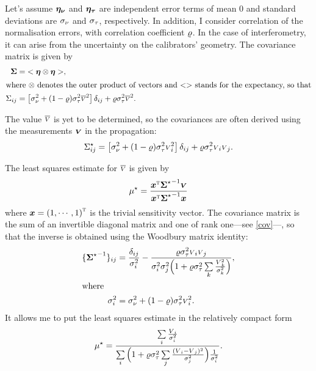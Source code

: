 \documentclass{pasa}
\begin{document}
Let's assume $\boldsymbol{\eta_\nu}$ and $\boldsymbol{\eta_\tau}$ are independent error terms of mean 0 and standard deviations are $\sigma_\nu$ and $\sigma_\tau$, respectively. In addition, I consider correlation of the normalisation errors, with correlation coefficient $\varrho$.  In the case of interferometry, it can arise from the uncertainty on the calibrators' geometry.  The covariance matrix is given by
\begin{align}
    \boldsymbol{\Sigma}     &=  {<\boldsymbol{\eta}\otimes\boldsymbol{\eta}>} ,\\
\intertext{where $\otimes$ denotes the outer product of vectors and $ {<>} $ stands for the expectancy, so that}
    \Sigma_{ij} &= \left[ \sigma_\nu^2 
                  + (1-\varrho)\sigma_\tau^2\overline{{\scriptstyle V}}^2
                \right] \delta_{ij} 
            + \varrho\sigma_\tau^2\overline{{\scriptstyle V}}^2.
\end{align}

The value $\overline{{\scriptstyle V}}$ is yet to be determined, so the covariances are often derived using the measurements $\boldsymbol{{\scriptstyle V}}$ in the propagation:
\begin{equation}
    \Sigma_{ij}^\star = \left[ 
                    \sigma_\nu^2 
                  + (1-\varrho)\sigma_\tau^2 {\scriptstyle V}_i^2
                \right] \delta_{ij} 
            + \varrho\sigma_\tau^2{\scriptstyle V}_i{\scriptstyle V}_j. \label{eq:cov}
\end{equation}

The least squares estimate for $\overline{{\scriptstyle V}}$ is given by
\begin{equation}
    \mu^\star =
                  \frac { {\boldsymbol{x}}^\text{\textsc{t}}{\ensuremath{\boldsymbol{\Sigma}}^\star}^{-1}\boldsymbol{{\scriptstyle V}} }
                        { {\boldsymbol{x}}^\text{\textsc{t}}{\ensuremath{\boldsymbol{\Sigma}}^\star}^{-1}\boldsymbol{x} }
\end{equation}
where $\boldsymbol{x} = {(1, \cdots, 1)}^\text{\textsc{t}}$ is the trivial sensitivity vector.  The covariance matrix is the sum of an invertible diagonal matrix and one of rank one---see \eqref{cov}---, so that the inverse is obtained using the Woodbury matrix identity: 
\begin{align}
    \{ {\boldsymbol{\Sigma}^\star}^{-1} \}_{ij} &= \frac{\delta_{ij}}{\sigma_i^2}
         - \frac{\varrho\sigma_\tau^2{\scriptstyle V}_i{\scriptstyle V}_j}
                {\sigma_i^2\sigma_j^2\Big(1 + 
            \varrho\sigma_\tau^2\sum\limits_{k} \frac{{\scriptstyle V}_k^2}{\sigma_k^2}\Big)},\\
  \intertext{where}
  \sigma_i^2 &= \sigma_\nu^2+(1-\varrho)\sigma_\tau^2{\scriptstyle V}_i^2.
\end{align}
It allows me to put the least squares estimate in the relatively compact form 
\begin{equation}
  \mu^\star = 
    \frac { 
      \sum\limits_i \frac{{\scriptstyle V}_i}{\sigma_i^2}
    }{ 
      \sum\limits_i 
          \Big( 1   
             + \varrho\sigma_\tau^2\sum\limits_{j} \frac{({\scriptstyle V}_i-{\scriptstyle V}_j)^2}{\sigma_j^2}
           \Big)
          \frac{1}{\sigma_i^2} 
   }.\label{eq:mu}
\end{equation}
\end{document}
